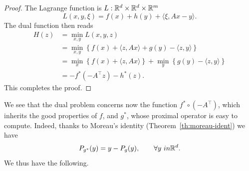      \begin{proof}
         The Lagrange function is $L:\mathbb{R}^d\times\mathbb{R}^d\times \mathbb{R}^m$
         \begin{equation}
             L(x,y,\xi) = f(x)+h(y) +\langle \xi, Ax-y\rangle.
         \end{equation}
         The dual function then reads
         \begin{equation}
             \begin{aligned}
                 H(z)
                  & = \min_{x,y} L(x,y,z)                                                                    \\
                  & = \min_{x,y} \left\{ f(x) + \langle z, Ax \rangle + g(y) - \langle z, y \rangle \right\} \\
                  & = \min_{x} \left\{ f(x) + \langle z, Ax \rangle \right\}
                 + \min_{y} \left\{ g(y) - \langle z, y \rangle \right\}                                     \\
                  & = - f^*(-A^\top z) - h^*(z).
             \end{aligned}
         \end{equation}
         This completes the proof.
     \end{proof}
 
     We see that the dual problem concerns now the function $f^*\circ (-A^\top)$, which inherits the good properties of $f$, and $g^*$, whose proximal operator is easy to compute. Indeed, thanks to Moreau's identity (Theorem~\ref{th:moreau-ident}) we have
 \begin{equation}
     P_{g^*}(y) = y - P_g(y), \qquad \forall y\ in \mathbb{R}^d.
 \end{equation}
 We thus have the following.
 
 
